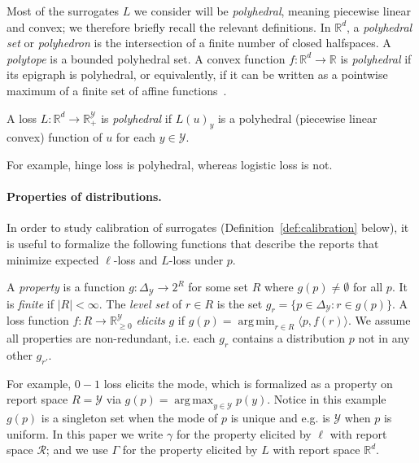 \documentclass[anon]{colt2020} %
\newcommand{\reals}{\mathbb{R}}
\newcommand{\nonnegreals}{\reals_{\geq 0}}%
\newcommand{\simplex}{\Delta_\Y}
\newcommand{\R}{\mathcal{R}}
\newcommand{\Y}{\mathcal{Y}}
\newcommand{\inprod}[2]{\langle #1, #2 \rangle}%
\DeclareMathOperator*{\argmax}{arg\,max}
\DeclareMathOperator*{\argmin}{arg\,min}
\begin{document}
Most of the surrogates $L$ we consider will be \emph{polyhedral}, meaning piecewise linear and convex; we therefore briefly recall the relevant definitions.
In $\reals^d$, a \emph{polyhedral set} or \emph{polyhedron} is the intersection of a finite number of closed halfspaces.
A \emph{polytope} is a bounded polyhedral set.
A convex function $f:\reals^d\to\reals$ is \emph{polyhedral} if its epigraph is polyhedral, or equivalently, if it can be written as a pointwise maximum of a finite set of affine functions~\citep{rockafellar1997convex}.
%
\begin{definition}
	A loss $L: \reals^d \to \reals^{\Y}_+$ is \emph{polyhedral} if $L(u)_y$ is a polyhedral (piecewise linear convex) function of $u$ for each $y\in\Y$.
\end{definition}
%
For example, hinge loss is polyhedral, whereas logistic loss is not.

\paragraph{Properties of distributions.}
In order to study calibration of surrogates (Definition~\ref{def:calibration} below), it is useful to formalize the following functions that describe the reports that minimize expected $\ell$-loss and $L$-loss under $p$.
\begin{definition}
  A \emph{property} is a function $g: \simplex \to 2^{R}$ for some set $R$ where $g(p) \neq \emptyset$ for all $p$.
  It is \emph{finite} if $|R| < \infty$.
  The \emph{level set} of $r \in R$ is the set $g_r = \{p \in \simplex : r \in g(p)\}$.
  A loss function $f: R \to \nonnegreals^{\Y}$ \emph{elicits} $g$ if $g(p) = \argmin_{r \in R} \inprod{p}{f(r)}$.
  We assume all properties are non-redundant, i.e. each $g_r$ contains a distribution $p$ not in any other $g_{r'}$.
\end{definition}
For example, $0-1$ loss elicits the mode, which is formalized as a property on report space $R = \Y$ via $g(p) = \argmax_{y \in \Y} p(y)$.
Notice in this example $g(p)$ is a singleton set when the mode of $p$ is unique and e.g. is $\Y$ when $p$ is uniform.
In this paper we write $\gamma$ for the property elicited by $\ell$ with report space $\R$; and we use $\Gamma$ for the property elicited by $L$ with report space $\reals^d$.
\end{document}

